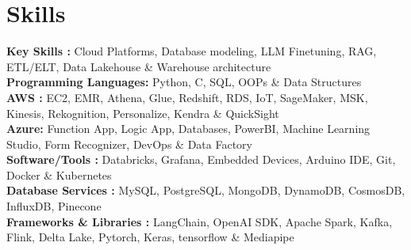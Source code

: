 \documentclass[letterpaper,6pt]{article}
\newcommand{\resumeSubHeadingListStart}{\begin{itemize}[leftmargin=0.15in, label={},partopsep=0.05pt]
\setlength\itemsep{1em}
}
\newcommand{\resumeSubHeadingListEnd}{\end{itemize}}
\begin{document}
\section{Skills}
  \resumeSubHeadingListStart
    \footnotesize{
    \item{
        \textbf{Key Skills : }{Cloud Platforms, Database modeling, LLM Finetuning, RAG, ETL/ELT, Data Lakehouse \& Warehouse architecture}\\
        \textbf{Programming Languages:}{ Python, C, SQL, OOPs \& Data Structures} \\
        \textbf{AWS : }{EC2, EMR, Athena, Glue, Redshift, RDS, IoT, SageMaker, MSK, Kinesis, Rekognition, Personalize, Kendra \& QuickSight} \\ %
        \textbf{Azure: }{Function App, Logic App, Databases, PowerBI, Machine Learning Studio, Form Recognizer, DevOps \& Data Factory} \\ %
        \textbf{Software/Tools : }{Databricks, Grafana, Embedded Devices, Arduino IDE, Git,  Docker \& Kubernetes}\\
         \textbf{Database Services : }{MySQL, PostgreSQL, MongoDB, DynamoDB, CosmosDB, InfluxDB, Pinecone}\\
        \textbf{Frameworks \& Libraries : }{LangChain, OpenAI SDK, Apache Spark, Kafka, Flink, Delta Lake, Pytorch, Keras, tensorflow \& Mediapipe}
    }}
  \resumeSubHeadingListEnd
\vspace{-14pt}
\end{document}
